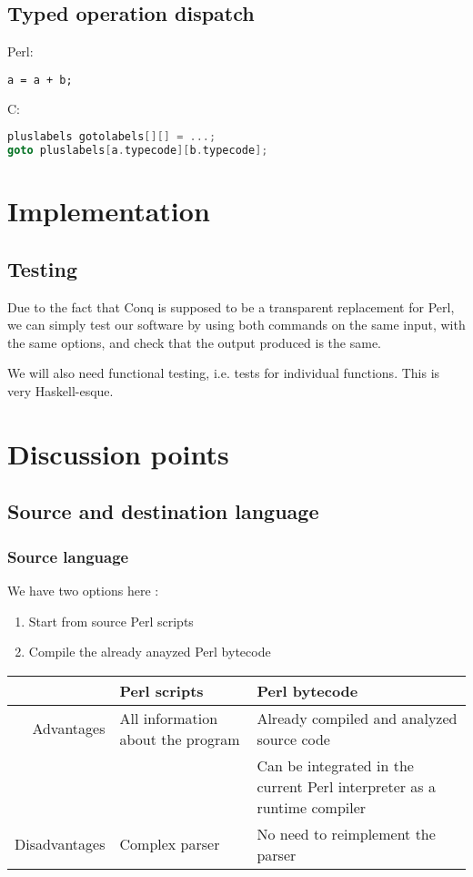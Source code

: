 \documentclass[11pt,a4paper]{report}
\newcommand{\pgl}[1]{\textsf{#1}}
\begin{document}
\section{Typed operation dispatch}


Perl:
\begin{lstlisting}[language=perl]
a = a + b;
\end{lstlisting}

C:
\begin{lstlisting}[language=C]
pluslabels gotolabels[][] = ...;
goto pluslabels[a.typecode][b.typecode];
\end{lstlisting}

\chapter{Implementation}

\section{Testing}

Due to the fact that Conq is supposed to be a transparent replacement for \pgl{Perl}, we can simply test our software by using both commands on the same input, with the same options, and check that the output produced is the same.

We will also need functional testing, i.e. tests for individual functions. This is very \pgl{Haskell}-esque.

\chapter{Discussion points}

\section{Source and destination language}

\subsection{Source language}

We have two options here :
\begin{enumerate}
\item Start from source Perl scripts
\item Compile the already anayzed Perl bytecode
\end{enumerate}

\begin{tabular}{|r|l|l|}
\hline
	& Perl scripts	& Perl bytecode \\
\hline
Advantages	& All information about the program	& Already compiled and analyzed source code \\
	&	& Can be integrated in the current Perl interpreter as a runtime compiler \\
\hline
Disadvantages	& Complex parser	& No need to reimplement the parser \\
\hline
\end{tabular}
\end{document}
